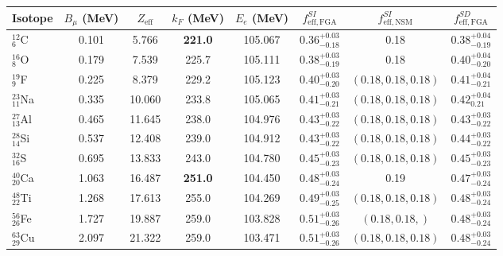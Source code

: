 \documentclass{book}[12pt]
\begin{document}
\begin{table}
\centering
\begin{tabular}{lccccccc}
\hline
\hline
Isotope & $B_{\mu}$ (MeV) & $Z_\mathrm{eff}$ & $k_F$ (MeV) & $E_e$ (MeV) & $f_\mathrm{eff,FGA}^{SI}$ & $f_\mathrm{eff,NSM}^{SI}$ & $f_\mathrm{eff,FGA}^{SD}$\\
\hline
$^{12}_6$C & 0.101 & 5.766 & \textbf{221.0} & 105.067 & $0.36^{+0.03}_{-0.18}$ & 0.18 & $0.38^{+0.04}_{-0.19}$\\
$^{16}_8$O & 0.179 & 7.539 & 225.7 & 105.111 & $0.38^{+0.03}_{-0.19}$ & 0.18 & $0.40^{+0.04}_{-0.20}$\\
$^{19}_9$F & 0.225 & 8.379 & 229.2 & 105.123 & $0.40^{+0.03}_{-0.20}$ & $(0.18,0.18,0.18)$ & $0.41^{+0.04}_{-0.21}$\\
$^{23}_{11}$Na & 0.335 & 10.060 & 233.8 & 105.065 & $0.41^{+0.03}_{-0.21}$ & $(0.18,0.18,0.18)$ & $0.42^{+0.04}_{0.21}$ \\
$^{27}_{13}$Al & 0.465 & 11.645 & 238.0 & 104.976 & $0.43^{+0.03}_{-0.22}$ & $(0.18, 0.18, 0.18)$ & $0.43^{+0.03}_{-0.22}$\\
$^{28}_{14}$Si & 0.537 & 12.408 & 239.0 & 104.912 & $0.43^{+0.03}_{-0.22}$ & $(0.18, 0.18, 0.18)$ & $0.44^{+0.03}_{-0.22}$ \\
$^{32}_{16}$S & 0.695 & 13.833 & 243.0 & 104.780 & $0.45^{+0.03}_{-0.23}$ & $(0.18,0.18,0.18)$ & $0.45^{+0.03}_{-0.23}$ \\
$^{40}_{20}$Ca & 1.063 & 16.487 & \textbf{251.0} & 104.450 & $0.48^{+0.03}_{-0.24}$ & 0.19 & $0.47^{+0.03}_{-0.24}$\\
$^{48}_{22}$Ti & 1.268 & 17.613 & 255.0 & 104.269 & $0.49^{+0.03}_{-0.25}$ & $(0.18,0.18,0.18)$ & $0.48^{+0.03}_{-0.24}$\\
$^{56}_{26}$Fe & 1.727 & 19.887 & 259.0 & 103.828 & $0.51^{+0.03}_{-0.26}$ & $(0.18,0.18, )$ & $0.48^{+0.03}_{-0.24}$ \\
$^{63}_{29}$Cu & 2.097 & 21.322 & 259.0 & 103.471 & $0.51^{+0.03}_{-0.26}$ & $(0.18, 0.18, 0.18)$ & $0.48^{+0.03}_{-0.24}$\\
\hline\hline
\end{tabular}

\end{table}
\end{document}
